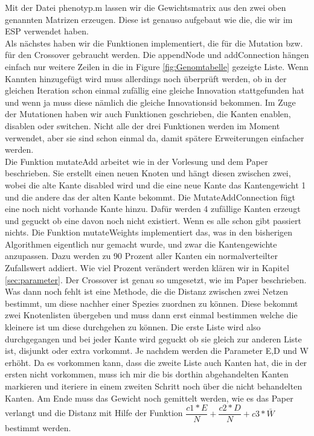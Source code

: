 \documentclass{hbrs-ecta-report}
\begin{document}
Mit der Datei phenotyp.m lassen wir die Gewichtsmatrix aus den zwei oben genannten Matrizen erzeugen. Diese ist genauso aufgebaut wie die, die wir im ESP verwendet haben.\\

Als nächstes haben wir die Funktionen implementiert, die für die Mutation bzw. für den Crossover gebraucht werden. Die appendNode und addConnection hängen einfach nur weitere Zeilen in die in Figure \ref{fig:Genomtabelle} gezeigte Liste. Wenn Kannten hinzugefügt wird muss allerdings noch überprüft werden, ob in der gleichen Iteration schon einmal zufällig eine gleiche Innovation stattgefunden hat und wenn ja muss diese nämlich die gleiche Innovationsid bekommen. Im Zuge der Mutationen haben wir auch Funktionen geschrieben, die Kanten enablen, disablen oder switchen. Nicht alle der drei Funktionen werden im Moment verwendet, aber sie sind schon einmal da, damit spätere Erweiterungen einfacher werden.\\ 
Die Funktion mutateAdd arbeitet wie in der Vorlesung und dem Paper beschrieben. Sie erstellt einen neuen Knoten und hängt diesen zwischen zwei, wobei die alte Kante disabled wird und die eine neue Kante das Kantengewicht 1 und die andere das der alten Kante bekommt.
Die MutateAddConnection fügt eine noch nicht vorhande Kante hinzu. Dafür werden 4 zufällige Kanten erzeugt und geguckt ob eine davon noch nicht existiert. Wenn es alle schon gibt passiert nichts.
Die Funktion mutateWeights implementiert das, was in den bisherigen Algorithmen eigentlich nur gemacht wurde, und zwar die Kantengewichte anzupassen. Dazu werden zu 90 Prozent aller Kanten ein normalverteilter Zufallswert addiert. Wie viel Prozent verändert werden klären wir in Kapitel \ref{sec:parameter}. Der Crossover ist genau so umgesetzt, wie im Paper beschrieben.\\

Was dann noch fehlt ist eine Methode, die die Distanz zwischen zwei Netzen bestimmt, um diese nachher einer Spezies zuordnen zu können. Diese bekommt zwei Knotenlisten übergeben und muss dann erst einmal bestimmen welche die kleinere ist um diese durchgehen zu können. Die erste Liste wird also durchgegangen und bei jeder Kante wird geguckt ob sie gleich zur anderen Liste ist, disjunkt oder extra vorkommt. Je nachdem werden die Parameter E,D und W erhöht. Da es vorkommen kann, dass die zweite Liste auch Kanten hat, die in der ersten nicht vorkommen, muss ich mir die bis dorthin abgehandelten Kanten markieren und iteriere in einem zweiten Schritt noch über die nicht behandelten Kanten. Am Ende muss das Gewicht noch gemittelt werden, wie es das Paper verlangt und die Distanz mit Hilfe der Funktion $ \dfrac{c1*E}{N}+\dfrac{c2*D}{N}+c3*\bar{W}$ bestimmt werden.\\
\end{document}
